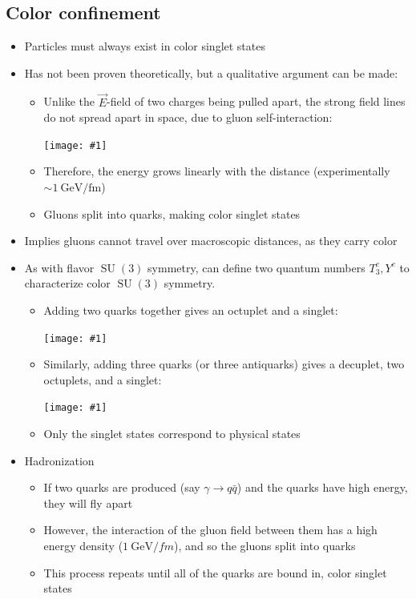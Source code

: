 \documentclass[11pt]{article}
\newcommand{\qbar}{{\bar{q}}}
\newcommand{\E}{\vec{E}}
\DeclareMathOperator{\SU}{SU}
\newcommand{\gev}{\text{GeV}}
\newcommand{\fm}{\text{fm}}
\newcommand{\embedimgw}[2]{\begin{center}\texttt{[image: \#1]}\end{center}}
\begin{document}
\subsection{Color confinement}
\begin{itemize}
  \item Particles must always exist in color singlet states 
  \item Has not been proven theoretically, but a qualitative argument can be made:
  \begin{itemize}
    \item Unlike the $\E$-field of two charges being pulled apart, the strong field lines do not spread apart in space, due to gluon self-interaction:
    \embedimgw{figs/qcdfieldlines.png}{.6}
    \item Therefore, the energy grows linearly with the distance (experimentally $\sim 1~\gev/\fm$)
    \item Gluons split into quarks, making color singlet states
  \end{itemize}
  \item Implies gluons cannot travel over macroscopic distances, as they carry color
  \item As with flavor $\SU(3)$ symmetry, can define two quantum numbers $T_3^c,Y^c$ to characterize color $\SU(3)$ symmetry.
  \begin{itemize}
    \item Adding two quarks together gives an octuplet and a singlet:
    \embedimgw{figs/mesoncolor.png}{0.6}
    \item Similarly, adding three quarks (or three antiquarks) gives a decuplet, two octuplets, and a singlet:
    \embedimgw{figs/baryoncolor.png}{0.6}
    \item Only the singlet states correspond to physical states
  \end{itemize}
  \item Hadronization
  \begin{itemize}
    \item If two quarks are produced (say $\gamma\rightarrow q\qbar$) and the quarks have high energy, they will fly apart
    \item However, the interaction of the gluon field between them has a high energy density ($1~\gev/fm$), and so the gluons split into quarks
    \item This process repeats until all of the quarks are bound in, color singlet states
  \end{itemize}
\end{itemize}
\end{document}
